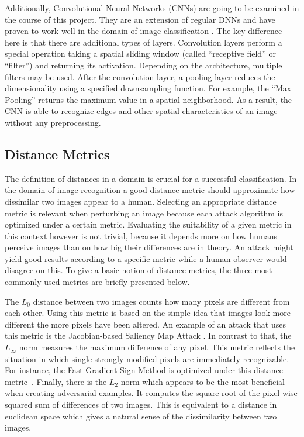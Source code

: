 Additionally, Convolutional Neural Networks (CNNs) are going to be examined in the course of this project.
They are an extension of regular DNNs and have proven to work well in the domain of image classification \cite{matsugu2003subject, krizhevsky2012imagenet}.
The key difference here is that there are additional types of layers.
Convolution layers perform a special operation taking a spatial sliding window (called \enquote{receptive field} or \enquote{filter}) and returning its activation.
Depending on the architecture, multiple filters may be used.
After the convolution layer, a pooling layer reduces the dimensionality using a specified downsampling function.
For example, the \enquote{Max Pooling} returns the maximum value in a spatial neighborhood.
As a result, the CNN is able to recognize edges and other spatial characteristics of an image without any preprocessing.

\subsection{Distance Metrics}\label{subsec:metrics}
The definition of distances in a domain is crucial for a successful classification.
In the domain of image recognition a good distance metric should approximate how dissimilar two images appear to a human.
Selecting an appropriate distance metric is relevant when perturbing an image because each attack algorithm is optimized under a certain metric.
Evaluating the suitability of a given metric in this context however is not trivial, because it depends more on how humans perceive images than on how big their differences are in theory.
An attack might yield good results according to a specific metric while a human observer would disagree on this.
To give a basic notion of distance metrics, the three most commonly used metrics are briefly presented below.

The $L_0$ distance between two images counts how many pixels are different from each other.
Using this metric is based on the simple idea that images look more different the more pixels have been altered.
An example of an attack that uses this metric is the Jacobian-based Saliency Map Attack \cite{papernot2016limitations}.
In contrast to that, the $L_\infty$ norm measures the maximum difference of any pixel.
This metric reflects the situation in which single strongly modified pixels are immediately recognizable.
For instance, the Fast-Gradient Sign Method is optimized under this distance metric~\cite{szegedy2015explaining}.
Finally, there is the $L_2$ norm which appears to be the most beneficial when creating adversarial examples.
It computes the square root of the pixel-wise squared sum of differences of two images.
This is equivalent to a distance in euclidean space which gives a natural sense of the dissimilarity between two images.

